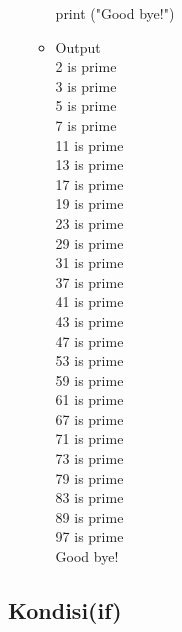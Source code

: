 \documentclass{article}
\begin{document}
\begin{enumerate}
\begin{itemize}
                            print ("Good bye!")\\
                    \item Output\\
                            2  is prime\\
                            3  is prime\\
                            5  is prime\\
                            7  is prime\\
                            11  is prime\\
                            13  is prime\\
                            17  is prime\\
                            19  is prime\\
                            23  is prime\\
                            29  is prime\\
                            31  is prime\\
                            37  is prime\\
                            41  is prime\\
                            43  is prime\\
                            47  is prime\\
                            53  is prime\\
                            59  is prime\\
                            61  is prime\\
                            67  is prime\\
                            71  is prime\\
                            73  is prime\\
                            79  is prime\\
                            83  is prime\\
                            89  is prime\\
                            97  is prime\\
                            Good bye!\\
                \end{itemize} 
        \end{enumerate}
        
    \subsection{Kondisi(if)}
\end{document}
